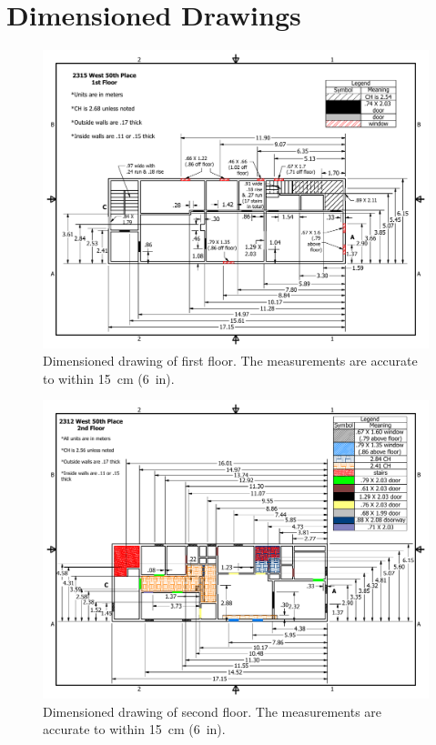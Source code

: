 \documentclass[12pt,oneside]{book}
\begin{document}


\appendix

\chapter{Dimensioned Drawings}

\begin{figure}[!ht]
\centering
\includegraphics[width=1\textwidth]{../Figures/50th_Place_1st_Floor}
\caption[Dimensioned drawing of first floor.]{Dimensioned drawing of first floor. The measurements are accurate to within 15~cm (6~in).}
\label{fig:first_floor}
\end{figure}

\begin{figure}[!ht]
\centering
\includegraphics[width=1\textwidth]{../Figures/50th_Place_2nd_Floor}
\caption[Dimensioned drawing of second floor.]{Dimensioned drawing of second floor. The measurements are accurate to within 15~cm (6~in).}
\label{fig:second_floor}
\end{figure}
\end{document}
